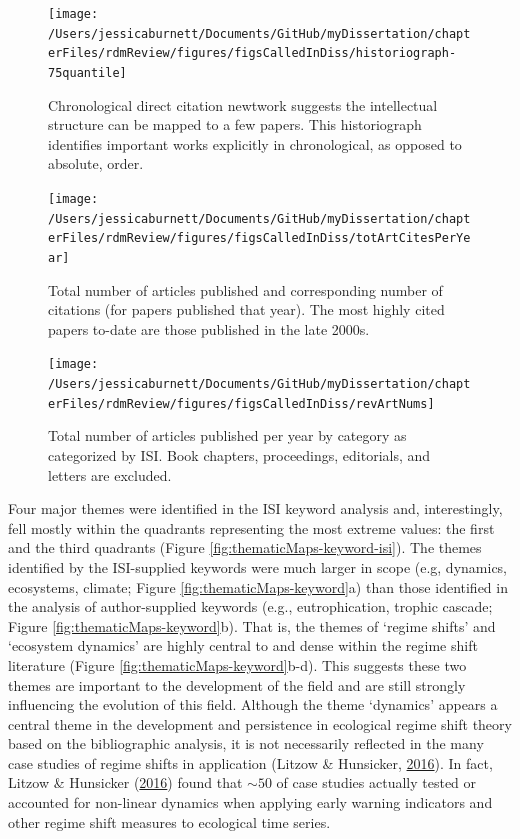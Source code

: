 \documentclass[12pt,twoside,openany]{reedthesis}
\begin{document}
\begin{figure}[bth]

{\centering \texttt{[image: /Users/jessicaburnett/Documents/GitHub/myDissertation/chapterFiles/rdmReview/figures/figsCalledInDiss/historiograph-75quantile]} 

}

\caption{Chronological direct citation newtwork suggests the intellectual structure can be mapped to a few papers. This historiograph identifies important works explicitly in chronological, as opposed to absolute, order.}\label{fig:historiograph}
\end{figure}
\begin{figure}[bth]

{\centering \texttt{[image: /Users/jessicaburnett/Documents/GitHub/myDissertation/chapterFiles/rdmReview/figures/figsCalledInDiss/totArtCitesPerYear]} 

}

\caption{Total number of articles published and corresponding number of citations (for papers published that year). The most highly cited papers to-date are those published in the late 2000s.}\label{fig:totArtCitesPerYear}
\end{figure}
\begin{figure}[bth]

{\centering \texttt{[image: /Users/jessicaburnett/Documents/GitHub/myDissertation/chapterFiles/rdmReview/figures/figsCalledInDiss/revArtNums]} 

}

\caption{Total number of articles published per year by category as categorized by ISI. Book chapters, proceedings, editorials, and letters are excluded.}\label{fig:revArtNums}
\end{figure}
Four major themes were identified in the ISI keyword analysis and, interestingly, fell mostly within the quadrants representing the most extreme values: the first and the third quadrants (Figure \ref{fig:thematicMaps-keyword-isi}). The themes identified by the ISI-supplied keywords were much larger in scope (e.g, dynamics, ecosystems, climate; Figure \ref{fig:thematicMaps-keyword}a) than those identified in the analysis of author-supplied keywords (e.g., eutrophication, trophic cascade; Figure \ref{fig:thematicMaps-keyword}b). That is, the themes of `regime shifts' and `ecosystem dynamics' are highly central to and dense within the regime shift literature (Figure \ref{fig:thematicMaps-keyword}b-d). This suggests these two themes are important to the development of the field and are still strongly influencing the evolution of this field. Although the theme `dynamics' appears a central theme in the development and persistence in ecological regime shift theory based on the bibliographic analysis, it is not necessarily reflected in the many case studies of regime shifts in application (Litzow \& Hunsicker, \protect\hyperlink{ref-litzow_early_2016}{2016}). In fact, Litzow \& Hunsicker (\protect\hyperlink{ref-litzow_early_2016}{2016}) found that \(\sim50%
\) of case studies actually tested or accounted for non-linear dynamics when applying early warning indicators and other regime shift measures to ecological time series.
\end{document}
